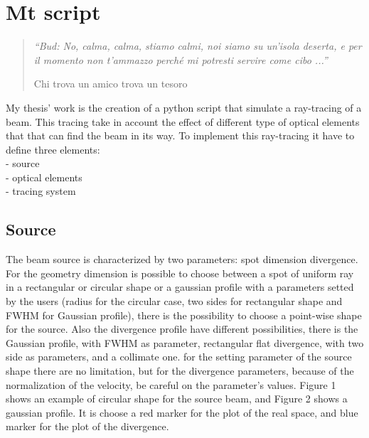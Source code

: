 \chapter{Mt script}
\label{capitolo4}
\thispagestyle{empty}

\begin{quotation}
{\footnotesize
\noindent \emph{``Bud: No, calma, calma, stiamo calmi, noi siamo su un'isola deserta, e per il momento non t'ammazzo perch\'e mi potresti servire come cibo ...''}
\begin{flushright}
Chi trova un amico trova un tesoro
\end{flushright}
}
\end{quotation}
\vspace{0.5cm}

My thesis' work is the creation of a python script that simulate a ray-tracing of a beam. This tracing take in account the effect of different type of optical elements that that can find the beam in its way. To implement this ray-tracing it have to define three elements:
\\ - source
\\ - optical elements
\\ - tracing system

\vspace{0.5cm}

\section{Source}
The beam source is characterized by two parameters: spot dimension divergence. For the geometry dimension is possible to choose between a spot of uniform ray in a rectangular or circular shape or a gaussian profile with a parameters setted by the users (radius for the circular case, two sides for rectangular shape and FWHM for Gaussian profile), there is the possibility to choose a point-wise shape for the source. Also the divergence profile have different possibilities, there is the Gaussian profile, with FWHM as parameter, rectangular flat divergence, with two side as parameters, and a collimate one. for the setting parameter of the source shape there are no limitation, but for the divergence parameters, because of the normalization of the velocity, be careful on the parameter's values.
Figure 1 shows an example of circular shape for the source beam, and Figure 2 shows a gaussian profile. It is choose a red marker for the plot of the real space, and blue marker for the plot of the divergence.

